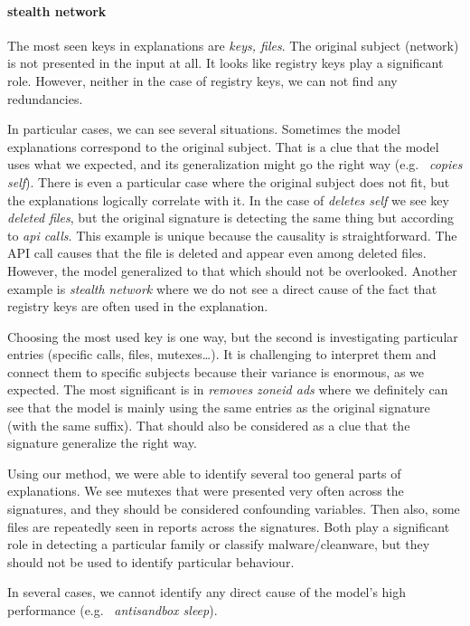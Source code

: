 \paragraph{stealth network}
The most seen keys in explanations are \emph{keys, files}. The original subject (network) is not presented in the input at all. It looks like registry keys play a significant role. However, neither in the case of registry keys, we can not find any redundancies.

\hfill \break

In particular cases, we can see several situations. Sometimes the model explanations correspond to the original subject. That is a clue that the model uses what we expected, and its generalization might go the right way (e.g. \ \emph{copies self}). There is even a particular case where the original subject does not fit, but the explanations logically correlate with it. In the case of \emph{deletes self} we see key \emph{deleted files}, but the original signature is detecting the same thing but according to \emph{api calls}. This example is unique because the causality is straightforward. The API call causes that the file is deleted and appear even among deleted files. However, the model generalized to that which should not be overlooked. Another example is \emph{stealth network} where we do not see a direct cause of the fact that registry keys are often used in the explanation.

Choosing the most used key is one way, but the second is investigating particular entries (specific calls, files, mutexes\dots). It is challenging to interpret them and connect them to specific subjects because their variance is enormous, as we expected. The most significant is in \emph{removes zoneid ads} where we definitely can see that the model is mainly using the same entries as the original signature (with the same suffix). That should also be considered as a clue that the signature generalize the right way.

Using our method, we were able to identify several too general parts of explanations. We see mutexes that were presented very often across the signatures, and they should be considered confounding variables. Then also, some files are repeatedly seen in reports across the signatures. Both play a significant role in detecting a particular family or classify malware/cleanware, but they should not be used to identify particular behaviour.

In several cases, we cannot identify any direct cause of the model's high performance (e.g. \ \emph{antisandbox sleep}).


